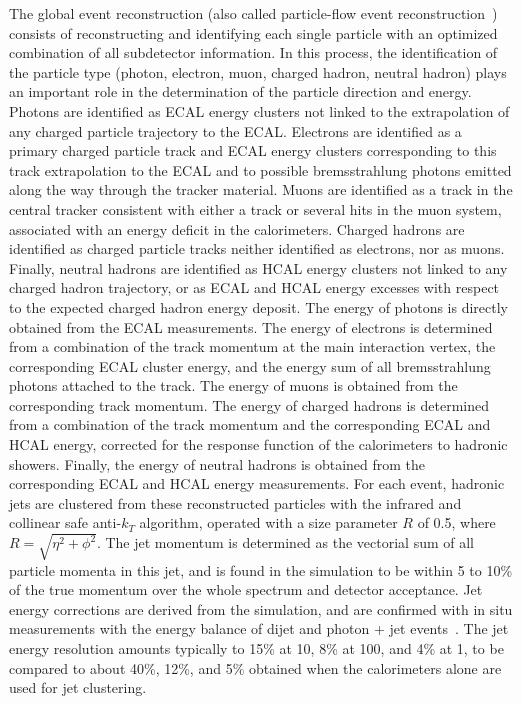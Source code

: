 The global event reconstruction (also called particle-flow event reconstruction~\cite{CMS-PAS-PFT-09-001,CMS-PAS-PFT-10-001}) consists of reconstructing and identifying each single particle with an optimized combination of all subdetector information. In this process, the identification of the particle type (photon, electron, muon, charged hadron, neutral hadron) plays an important role in the determination of the particle direction and energy. Photons are identified as ECAL energy clusters not linked to the extrapolation of any charged particle trajectory to the ECAL. Electrons are identified as a primary charged particle track and ECAL energy clusters corresponding to this track extrapolation to the ECAL and to possible bremsstrahlung photons emitted along the way through the tracker material. Muons are identified as a track in the central tracker consistent with either a track or several hits in the muon system, associated with an energy deficit in the calorimeters. Charged hadrons are identified as charged particle tracks neither identified as electrons, nor as muons. Finally, neutral hadrons are identified as HCAL energy clusters not linked to any charged hadron trajectory, or as ECAL and HCAL energy excesses with respect to the expected charged hadron energy deposit.
The energy of photons is directly obtained from the ECAL measurements. The energy of electrons is determined from a combination of the track momentum at the main interaction vertex, the corresponding ECAL cluster energy, and the energy sum of all bremsstrahlung photons attached to the track. The energy of muons is obtained from the corresponding track momentum. The energy of charged hadrons is determined from a combination of the track momentum and the corresponding ECAL and HCAL energy, corrected for the response function of the calorimeters to hadronic showers. Finally, the energy of neutral hadrons is obtained from the corresponding ECAL and HCAL energy measurements.
For each event, hadronic jets are clustered from these reconstructed particles with the infrared and collinear safe anti-$k_T$ algorithm, operated with a size parameter $R$ of 0.5, where $R = \sqrt{\eta^2 + \phi^2}$\cite{Chatrchyan:2011ds}. The jet momentum is determined as the vectorial sum of all particle momenta in this jet, and is found in the simulation to be within 5 to 10\% of the true momentum over the whole \pt spectrum and detector acceptance. Jet energy corrections are derived from the simulation, and are confirmed with in situ measurements with the energy balance of dijet and photon + jet events~\cite{Chatrchyan:2011ds}. The jet energy resolution amounts typically to 15\% at 10\GeV, 8\% at 100\GeV, and 4\% at 1\TeV, to be compared to about 40\%, 12\%, and 5\% obtained when the calorimeters alone are used for jet clustering.

